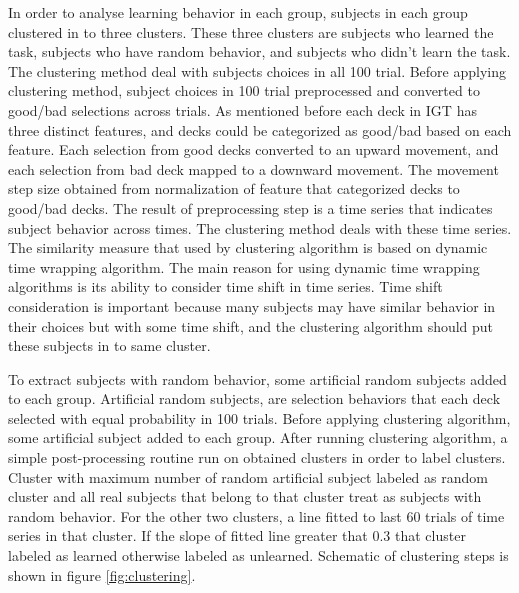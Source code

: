 \documentclass[12pt,twocolumn]{elsarticle}
\begin{document}
In order to analyse learning behavior in
each group, subjects in each group
clustered in to three clusters. These three clusters
are subjects who learned the task,
subjects who have random behavior, and
subjects who didn't learn the task.  The
clustering method deal with subjects
choices in all 100 trial. Before
applying clustering method, subject
choices in 100 trial preprocessed and
converted to good/bad selections across
trials. As mentioned before each deck in
IGT has three distinct features, and
decks could be categorized as good/bad
based on each feature. Each selection
from good decks converted to an upward
movement, and each selection from bad
deck mapped to a downward movement. The
movement step size obtained from
normalization of feature that
categorized decks to good/bad decks. 
The result of
preprocessing step is a time series that
indicates subject behavior across times.
The clustering method deals with these
time series. The similarity measure that
used by clustering algorithm is based on
dynamic time wrapping algorithm. The
main reason for using dynamic time
wrapping algorithms is its ability to
consider time shift in time series. Time
shift consideration is important because
many subjects may have similar behavior
in their choices but with some time
shift, and the clustering algorithm
should put these subjects in to same
cluster. 



To extract subjects with random
behavior, some artificial random
subjects added to each group. Artificial
random subjects, are selection behaviors
that each deck selected with equal
probability in 100 trials. 
Before applying clustering algorithm, some
artificial subject added to each group.
After running
clustering algorithm, a simple
post-processing routine run on obtained
clusters in order to label clusters.
Cluster with maximum number of random
artificial subject labeled as random
cluster and all real subjects that
belong to that cluster treat as subjects
with random behavior. For the other two
clusters, a line fitted to last 60
trials of time series in that cluster.
If the slope of fitted line greater that
0.3 that cluster labeled as learned
otherwise labeled as unlearned.
Schematic of clustering steps is shown
in figure \ref{fig:clustering}.
\end{document}
